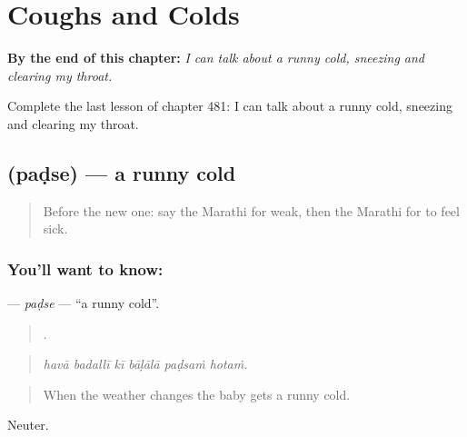 
\chapter{Coughs and Colds}
\label{ch:mr-coughs-and-colds}

\begin{chapteropening}
\textbf{By the end of this chapter:} \emph{I can talk about a runny cold, sneezing and clearing my throat.}

Complete the last lesson of chapter 481: I can talk about a runny cold, sneezing and clearing my throat.
\end{chapteropening}

\section[\texorpdfstring{\mr{पडसे} (paḍse)}{पडसे (paḍse)}]{ (paḍse) — a runny cold}

\label{lesson:MR-C481-padse}



\begin{quote}
Before the new one: say the Marathi for weak, then the Marathi for to feel sick.
\end{quote}

\subsection*{You'll want to know: }
\textbf{} — \emph{paḍse} — \textquotedblleft{}a runny cold\textquotedblright{}.

\begin{quote}
     .
\end{quote}

\begin{quote}
\emph{havā badallī kī bāḷālā paḍsaṁ hotaṁ.}
\end{quote}

\begin{quote}
When the weather changes the baby gets a runny cold.
\end{quote}

Neuter.

